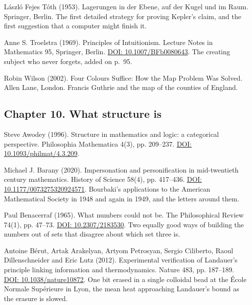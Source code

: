 \documentclass[11pt,twoside]{article}
\theoremstyle{thielethm}
\theoremstyle{thieledef}
\theoremstyle{thieledef}
\theoremstyle{thieledef}
\theoremstyle{thielethm}
\theoremstyle{thieleobs}
\theoremstyle{thielethm}
\begin{document}
\noindent L\'aszl\'o Fejes T\'oth (1953). Lagerungen in der Ebene, auf der Kugel und im Raum. Springer, Berlin. The first detailed strategy for proving Kepler's claim, and the first suggestion that a computer might finish it.
\par\medskip

\noindent Anne S. Troelstra (1969). Principles of Intuitionism. Lecture Notes in Mathematics 95, Springer, Berlin. \href{https://doi.org/10.1007/BFb0080643}{DOI: 10.1007/BFb0080643}. The creating subject who never forgets, added on p.~95.
\par\medskip

\noindent Robin Wilson (2002). Four Colours Suffice: How the Map Problem Was Solved. Allen Lane, London. Francis Guthrie and the map of the counties of England.
\par\medskip

\subsection*{Chapter 10. What structure is}

\noindent Steve Awodey (1996). Structure in mathematics and logic: a categorical perspective. Philosophia Mathematica 4(3), pp. 209--237. \href{https://doi.org/10.1093/philmat/4.3.209}{DOI: 10.1093/philmat/4.3.209}.
\par\medskip

\noindent Michael J. Barany (2020). Impersonation and personification in mid-twentieth century mathematics. History of Science 58(4), pp. 417--436. \href{https://doi.org/10.1177/0073275320924571}{DOI: 10.1177/0073275320924571}. Bourbaki's applications to the American Mathematical Society in 1948 and again in 1949, and the letters around them.
\par\medskip

\noindent Paul Benacerraf (1965). What numbers could not be. The Philosophical Review 74(1), pp. 47--73. \href{https://doi.org/10.2307/2183530}{DOI: 10.2307/2183530}. Two equally good ways of building the numbers out of sets that disagree about which set three is.
\par\medskip

\noindent Antoine B\'erut, Artak Arakelyan, Artyom Petrosyan, Sergio Ciliberto, Raoul Dillenschneider and Eric Lutz (2012). Experimental verification of Landauer's principle linking information and thermodynamics. Nature 483, pp. 187--189. \href{https://doi.org/10.1038/nature10872}{DOI: 10.1038/nature10872}. One bit erased in a single colloidal bead at the \'Ecole Normale Sup\'erieure in Lyon, the mean heat approaching Landauer's bound as the erasure is slowed.
\par\medskip
\end{document}
